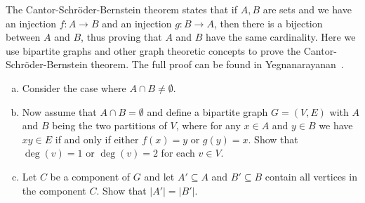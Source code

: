 \begin{problem}
\item The Cantor-Schr\"oder-Bernstein theorem states that if $A,B$ are
  sets and we have an injection $f: A \to B$ and an injection
  $g: B \to A$, then there is a bijection between $A$ and $B$, thus
  proving that $A$ and $B$ have the same cardinality. Here we use
  bipartite graphs and other graph theoretic concepts to prove the
  Cantor-Schr\"oder-Bernstein theorem. The full proof can be found in
  Yegnanarayanan~\cite{Yegnanarayanan2005}.
  \begin{enumerate}[(a)]
  \item Consider the case where $A \cap B \neq \emptyset$.

  \item Now assume that $A \cap B = \emptyset$ and define a bipartite
    graph $G = (V, E)$ with $A$ and $B$ being the two partitions of
    $V$, where for any $x \in A$ and $y \in B$ we have $xy \in E$ if
    and only if either $f(x) = y$ or $g(y) = x$. Show that
    $\deg(v) = 1$ or $\deg(v) = 2$ for each $v \in V$.

  \item Let $C$ be a component of $G$ and let $A' \subseteq A$ and
    $B' \subseteq B$ contain all vertices in the component $C$. Show
    that $|A'| = |B'|$.
  \end{enumerate}
\end{problem}
